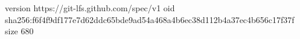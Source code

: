 version https://git-lfs.github.com/spec/v1
oid sha256:f6f4f9df177e7d62ddc65bde9ad54a468a4b6ec38d112b4a37ec4b656c17f37f
size 680
